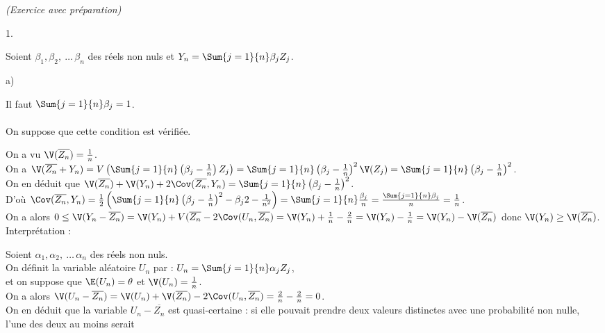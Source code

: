 \documentclass[11pt]{article}%
\begin{document}
\begin{exercice}{\it (Exercice avec préparation)}
\begin{noliste}{1.}
 \item Soient $\beta_{1}, \beta_{2},\ \dots\, \beta_{n}$ des réels non
 nuls et $Y_{n} = \Sum{j = 1}{n} \beta_{j} Z_{j}$. 
 \begin{noliste}{a)}
 \setlength{\itemsep}{2mm}
 \item Il faut $\Sum{j = 1}{n} \beta_{j} = 1$. \\
\\
 On suppose que cette condition est vérifiée. \\
 \item On a vu $\V( \overline{Z_{n}} ) = \frac{1}{n}$. \\
 On a $\V( \overline{Z_{n}} + Y_{n} ) = V \left( \Sum{j = 1}{n} \left(
 \beta_{j} - \frac{1}{n} \right) Z_{j} \right) = \Sum{j = 1}{n}
 \left( \beta_{j} - \frac{1}{n} \right)^{2} \V(Z_{j}) = \Sum{j = 1}{n}
 \left( \beta_{j} - \frac{1}{n} \right)^{2}$. \\
 On en déduit que $\V(\overline{Z_{n}} ) + \V(Y_{n}) + 2 \Cov (
 \overline{Z_{n}}, Y_{n}) = \Sum{j = 1}{n} \left( \beta_{j} -
 \frac{1}{n} \right)^{2}$. \\
 D'où $\Cov ( \overline{Z_{n}}, Y_{n}) = \frac{1}{2} \left(
 \Sum{j = 1}{n} \left( \beta_{j} - \frac{1}{n} \right)^{2} -
 \beta_{j}{2} - \frac{1}{n^{2}} \right) = \Sum{j = 1}{n}
 \frac{\beta_{j}}{n} = \frac{ \Sum{j = 1}{n} \beta_{j} }{n} = 
 \frac{1}{n}$. \\
 On a alors $0 \leq \V(Y_{n} - \overline{Z_{n}} ) = \V(Y_{n}) + 
 V(\overline{Z_{n}} - 2 \Cov ( U_{n}, \overline{Z_{n}} ) = \V(Y_{n}) + 
 \frac{1}{n} - \frac{2}{n} = \V(Y_{n}) - \frac{1}{n} = \V(Y_{n}) - \V(
 \overline{Z_{n}} )$ donc $\V(Y_{n}) \geq \V( \overline{Z_{n}})$. \\
 Interprétation : 
 \end{noliste}
 \item Soient $\alpha_{1}, \alpha_{2},\ \dots\, \alpha_{n}$ des réels
non
 nuls. \\
 On définit la variable aléatoire $U_{n}$ par : $U_{n} = \Sum{j = 1}{n}
 \alpha_{j} Z_{j}$, \\
 et on suppose que $\E(U_{n}) = \theta$ et $\V(U_{n}) = \frac{1}{n}$.
\\
 On a alors $\V( U_{n} - \overline{Z_{n}} ) = \V( U_{n}) + \V(
 \overline{Z_{n}}) - 2 \Cov (U_{n}, \overline{Z_{n}}) = \frac{2}{n} -
 \frac{2}{n} = 0$. \\
 On en déduit que la variable $U_{n} - \overline{Z_{n}}$ est
 quasi-certaine : si elle pouvait prendre deux valeurs distinctes
 avec une probabilité non nulle, l'une des deux au moins serait

\end{noliste}
\end{exercice}
\end{document}
